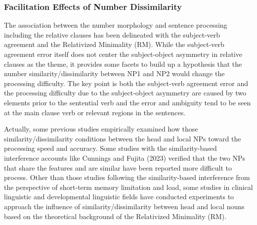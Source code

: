 \documentclass[
]{article}
\begin{document}
\subsubsection{Facilitation Effects of Number
Dissimilarity}\label{facilitation-effects-of-number-dissimilarity}

The association between the number morphology and sentence processing
including the relative clauses has been delineated with the subject-verb
agreement and the Relativized Minimality (RM). While the subject-verb
agreement error itself does not center the subject-object asymmetry in
relative clauses as the theme, it provides some facets to build up a
hypothesis that the number similarity/dissimilarity between NP1 and NP2
would change the processing difficulty. The key point is both the
subject-verb agreement error and the processing difficulty due to the
subject-object asymmetry are caused by two elements prior to the
sentential verb and the error and ambiguity tend to be seen at the main
clause verb or relevant regions in the sentences.

Actually, some previous studies empirically examined how those
similarity/dissimilarity conditions between the head and local NPs
toward the processing speed and accuracy. Some studies with the
similarity-based interference accounts like Cunnings and Fujita (2023)
verified that the two NPs that share the features and are similar have
been reported more difficult to process. Other than those studies
following the similarity-based interference from the perspective of
short-term memory limitation and load, some studies in clinical
linguistic and developmental linguistic fields have conducted
experiments to approach the influence of similarity/dissimilarity
between head and local nouns based on the theoretical background of the
Relativized Minimality (RM).
\end{document}
